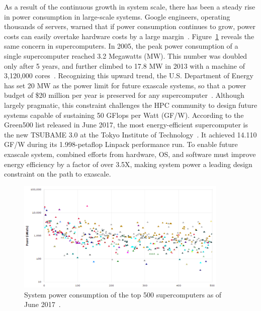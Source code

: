 As a result of the continuous growth in system scale, there has been a steady rise in power consumption in large-scale systems. 
Google engineers, operating thousands of servers, warned that if power consumption continues to grow, power costs can easily overtake hardware costs by a large margin~\cite{barroso2005price}. Figure~\ref{fig:top_500_power} reveals the same concern in supercomputers. 
In 2005, the peak power consumption of a single supercomputer reached 3.2 Megawatts (MW). This number was doubled only after 5 years, and 
further climbed to 17.8 
MW in 2013 with a machine of 3,120,000 cores~\cite{top500}. Recognizing this upward trend, the U.S. Department of Energy has set 20 
MW as the power limit for future exascale systems, so that a power budget of \$20 million per year is preserved for any supercomputer~\cite{doe_ascr_exascale_2011}. 
Although largely pragmatic, this constraint challenges the HPC community to design future systems capable of sustaining 50 GFlops
per Watt (GF/W). According to the Green500 list released in June 2017, the most energy-efficient supercomputer is the new TSUBAME 3.0 at the Tokyo Institute 
of Technology~\cite{top500}. It achieved 14.110 GF/W during its 1.998-petaflop Linpack performance run. To enable future exascale system, 
combined efforts from hardware, OS, and software must improve energy efficiency by a factor of over 3.5X, making system power a leading design constraint on the path to exascale. 

\begin{figure}[t]
	\begin{center}
		\includegraphics[width=0.9\textwidth]{Figures/top_power}
	\end{center}
	\caption{System power consumption of the top 500 supercomputers as of June 2017~\cite{top500}.}
	\label{fig:top_500_power}
\end{figure}

